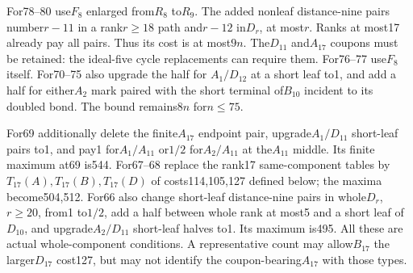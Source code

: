 \documentclass[11pt]{article}
\theoremstyle{remark}\newtheorem{remark}[theorem]{Remark}
\begin{document}
For78--80 use$F_8$ enlarged from$R_8$ to$R_9$. The added nonleaf
distance-nine pairs number$r-11$ in a rank$r\ge18$ path and$r-12$
in$D_r$, at most$r$. Ranks at most17 already pay all pairs.
Thus its cost is at most$9n$. The$D_{11}$ and$A_{17}$ coupons
must be retained: the ideal-five cycle replacements can require them.
For76--77 use$F_8$ itself. For70--75 also upgrade the half for
$A_1/D_{12}$ at a short leaf to1, and add a half for either$A_2$
mark paired with the short terminal of$B_{10}$ incident to its
doubled bond. The bound remains$8n$ for$n\le75$.

For69 additionally delete the finite$A_{17}$ endpoint pair,
upgrade$A_1/D_{11}$ short-leaf pairs to1, and pay1 for$A_1/A_{11}$
or$1/2$ for$A_2/A_{11}$ at the$A_{11}$ middle. Its finite maximum
at69 is544. For67--68 replace the rank17 same-component tables
by$T_{17}(A),T_{17}(B),T_{17}(D)$ of costs114,105,127 defined
below; the maxima become504,512. For66 also change short-leaf
distance-nine pairs in whole$D_r$, $r\ge20$, from1 to$1/2$,
add a half between whole rank at most5 and a short leaf of$D_{10}$,
and upgrade$A_2/D_{11}$ short-leaf halves to1. Its maximum is495.
All these are actual whole-component conditions. A representative
count may allow$B_{17}$ the larger$D_{17}$ cost127, but may not
identify the coupon-bearing$A_{17}$ with those types.
\end{document}
